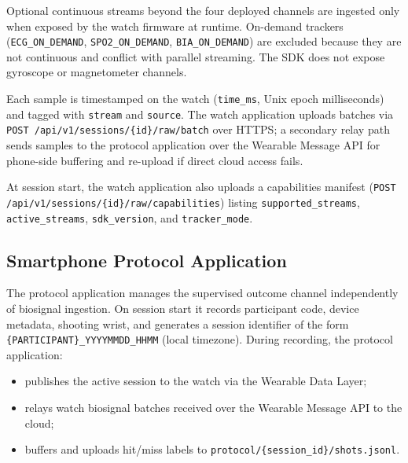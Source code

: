 \documentclass[sensors,article,submit,pdftex,moreauthors]{Definitions/mdpi}
\begin{document}
Optional continuous streams beyond the four deployed channels are ingested only when exposed by the watch firmware at runtime. On-demand trackers (\texttt{ECG\_ON\_DEMAND}, \texttt{SPO2\_ON\_DEMAND}, \texttt{BIA\_ON\_DEMAND}) are excluded because they are not continuous and conflict with parallel streaming. The SDK does not expose gyroscope or magnetometer channels.



Each sample is timestamped on the watch (\texttt{time\_ms}, Unix epoch milliseconds) and tagged with \texttt{stream} and \texttt{source}. The watch application uploads batches via \texttt{POST /api/v1/sessions/\{id\}/raw/batch} over HTTPS; a secondary relay path sends samples to the protocol application over the Wearable Message API for phone-side buffering and re-upload if direct cloud access fails.



At session start, the watch application also uploads a capabilities manifest (\texttt{POST /api/v1/sessions/\{id\}/raw/capabilities}) listing \texttt{supported\_streams}, \texttt{active\_streams}, \texttt{sdk\_version}, and \texttt{tracker\_mode}.



\subsection{Smartphone Protocol Application}



The protocol application manages the supervised outcome channel independently of biosignal ingestion. On session start it records participant code, device metadata, shooting wrist, and generates a session identifier of the form \texttt{\{PARTICIPANT\}\_YYYYMMDD\_HHMM} (local timezone). During recording, the protocol application:



\begin{itemize}

\item publishes the active session to the watch via the Wearable Data Layer;

\item relays watch biosignal batches received over the Wearable Message API to the cloud;

\item buffers and uploads hit/miss labels to \texttt{protocol/\{session\_id\}/shots.jsonl}.

\end{itemize}
\end{document}
